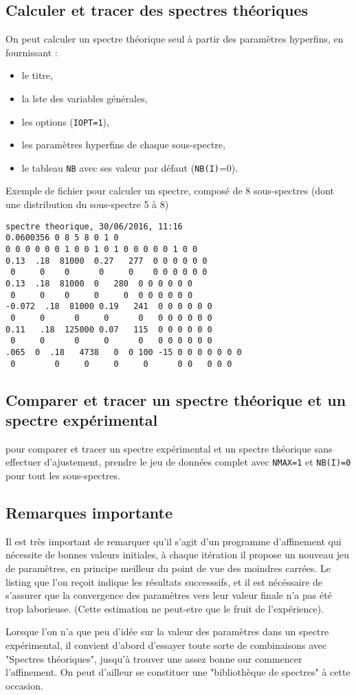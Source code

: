 \subsection{Calculer et tracer des spectres théoriques}
On  peut calculer un spectre théorique seul à partir des paramètres hyperfins, en fournissant :
\begin{itemize}
\item le titre,
\item la lste des variables générales,
\item les options (\lstinline{IOPT=1}),
\item les paramètres hyperfins de chaque sous-spectre,
\item le tableau \lstinline{NB} avec ses valeur par défaut (\lstinline{NB(I)}=0).
\end{itemize}

Exemple de fichier pour calculer un spectre, composé de 8 sous-spectres (dont une distribution du sous-spectre 5 à 8)
\begin{lstlisting}[frame=single]
spectre theorique, 30/06/2016, 11:16
0.0600356 0 8 5 8 0 1 0
0 0 0 0 0 0 1 0 0 1 0 1 0 0 0 0 0 1 0 0
0.13  .18  81000  0.27   277  0 0 0 0 0 0 
 0     0    0      0     0    0 0 0 0 0 0
0.13  .18  81000  0   280  0 0 0 0 0 0 
 0     0    0     0     0  0 0 0 0 0 0
-0.072  .18  81000 0.19   241  0 0 0 0 0 0 
 0     0      0     0      0   0 0 0 0 0 0
0.11   .18  125000 0.07   115  0 0 0 0 0 0 
 0     0      0     0      0   0 0 0 0 0 0
.065  0  .18   4738   0  0 100 -15 0 0 0 0 0 0 0
 0        0     0     0     0      0 0   0 0 0
\end{lstlisting}
\subsection{Comparer et tracer un spectre théorique et un spectre expérimental}
pour comparer et tracer un spectre expérimental et un spectre théorique sans effectuer d'ajustement,
 prendre le jeu de données complet avec \lstinline{NMAX=1} et \lstinline{NB(I)=0} pour tout les sous-spectres.
\subsection{Remarques importante}

Il est très important de remarquer qu'il s'agit d'un programme d'affinement qui nécessite de bonnes valeurs initiales, à chaque itération il propose un nouveau jeu de paramètres, en principe meilleur du point de vue des moindres carrées.
Le listing que l'on reçoit indique les résultats successsifs, et il est nécéssaire de s'assurer que la convergence des paramètres
vers leur valeur finale n'a pas été trop laborieuse. (Cette estimation ne peut-etre que le fruit de l'expérience).

Lorsque l'on n'a que peu d'idée sur la valeur des paramètres dans un spectre expérimental, il convient d'abord d'essayer toute sorte de combinaisons avec "Spectres théoriques", jusqu'à trouver une assez bonne our commencer l'affinement.
On peut d'ailleur se constituer une "bibliothèque de spectres" à cette occasion. 
